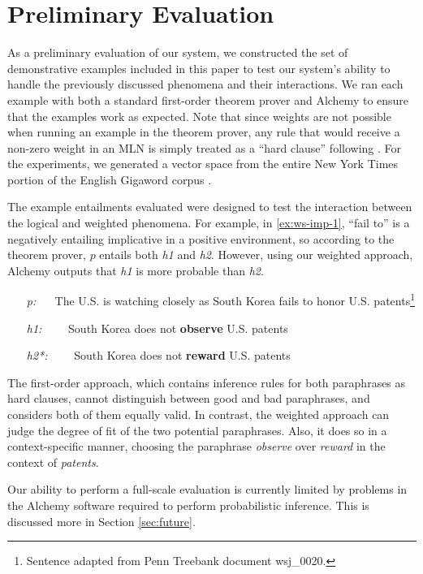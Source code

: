 \section{Preliminary Evaluation}

As a preliminary evaluation of our system, we constructed the set of 
demonstrative examples included in this paper to test our system's ability
to handle the previously discussed phenomena and their interactions.  We ran
each example with both a standard first-order theorem prover and Alchemy to
ensure that the examples work as expected. Note that since weights are not
possible when running an example in the theorem prover, any rule that would 
receive a non-zero weight in an MLN is simply treated as a ``hard clause'' following
\citet{bos:emnlp2005}.  For the experiments, we generated a vector space from
the entire New York Times portion of the English Gigaword corpus
\citep{graff:gigaword2003}.

The example entailments evaluated were designed to test the interaction between
the logical and weighted phenomena.  For example, in \eqref{ex:ws-imp-1}, ``fail
to'' is a negatively entailing implicative in a positive environment, so according 
to the theorem prover, $p$ entails both {\it h1} and {\it h2}.  However, using our
weighted approach, Alchemy outputs that {\it h1} is more probable than {\it h2}. 
\begin{covex}\label{ex:ws-imp-1}
\begin{itemize}
  \item[{\it p:}]~~    The U.S. is watching closely as South Korea fails to honor
  U.S. patents\footnote{Sentence adapted from Penn Treebank document wsj\_0020.}
  \item[{\it h1:}]~~~~South Korea does not {\bf observe} U.S. patents
  \item[{\it h2*:}]~~~~South Korea does not {\bf reward} U.S. patents
\end{itemize}
\end{covex}
The first-order approach, which contains inference rules for both
paraphrases as hard clauses, cannot distinguish between
good and bad paraphrases, and considers both of them equally valid. In
contrast, the weighted approach can judge the degree of fit of the two potential
paraphrases. Also, it does so in a context-specific manner, choosing
the paraphrase {\it observe} over {\it reward} in the context of
{\it patents}. 

Our ability to perform a full-scale evaluation is currently limited by problems
in the Alchemy software required to perform probabilistic inference.  This is
discussed more in Section \ref{sec:future}.
